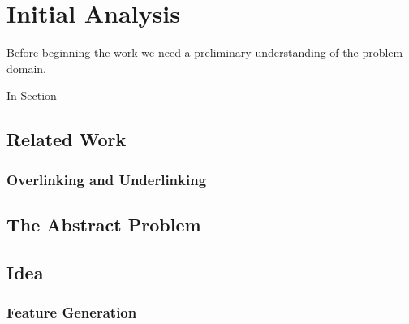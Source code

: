 \chapter{Initial Analysis}\label{chap:analysis}
Before beginning the work we need a preliminary understanding of the problem domain.

\begin{chapterorganization}
  \item In Section
 
\end{chapterorganization}

\section{Related Work}



\subsection{Overlinking and Underlinking}

\section{The Abstract Problem} 


\section{Idea} 

\subsection{Feature Generation}
\dummy

%
